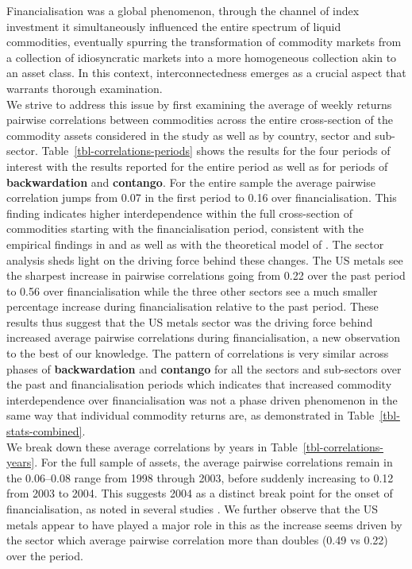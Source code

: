 \documentclass[
  authoryear,
  preprint,
  3p]{elsarticle}
\begin{document}
\medskip

Financialisation was a global phenomenon, through the channel of index
investment it simultaneously influenced the entire spectrum of liquid
commodities, eventually spurring the transformation of commodity markets
from a collection of idiosyncratic markets into a more homogeneous
collection akin to an asset class. In this context, interconnectedness
emerges as a crucial aspect that warrants thorough examination.\\
We strive to address this issue by first examining the average of weekly
returns pairwise correlations between commodities across the entire
cross-section of the commodity assets considered in the study as well as
by country, sector and sub-sector. Table~\ref{tbl-correlations-periods}
shows the results for the four periods of interest with the results
reported for the entire period as well as for periods of
\textbf{backwardation} and \textbf{contango}. For the entire sample the
average pairwise correlation jumps from 0.07 in the first period to 0.16
over financialisation. This finding indicates higher interdependence
within the full cross-section of commodities starting with the
financialisation period, consistent with the empirical findings in
\citet{fryMcKibbin_evolution_2023} and
\citet{mayer_financialization_2017} as well as with the theoretical
model of \citet{basak_model_2016}. The sector analysis sheds light on
the driving force behind these changes. The US metals see the sharpest
increase in pairwise correlations going from 0.22 over the past period
to 0.56 over financialisation while the three other sectors see a much
smaller percentage increase during financialisation relative to the past
period. These results thus suggest that the US metals sector was the
driving force behind increased average pairwise correlations during
financialisation, a new observation to the best of our knowledge. The
pattern of correlations is very similar across phases of
\textbf{backwardation} and \textbf{contango} for all the sectors and
sub-sectors over the past and financialisation periods which indicates
that increased commodity interdependence over financialisation was not a
phase driven phenomenon in the same way that individual commodity
returns are, as demonstrated in Table~\ref{tbl-stats-combined}.\\
We break down these average correlations by years in
Table~\ref{tbl-correlations-years}. For the full sample of assets, the
average pairwise correlations remain in the 0.06--0.08 range from 1998
through 2003, before suddenly increasing to 0.12 from 2003 to 2004. This
suggests 2004 as a distinct break point for the onset of
financialisation, as noted in several studies
\citep{baker_financialization_2021, tang_index_2012}. We further observe
that the US metals appear to have played a major role in this as the
increase seems driven by the sector which average pairwise correlation
more than doubles (0.49 vs 0.22) over the period.
\end{document}
